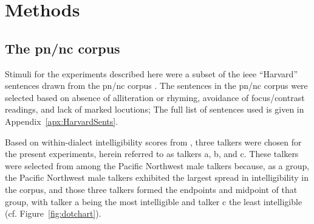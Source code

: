 \chapter{Methods\label{chap:Methods}}

\section{The \ac{pn/nc} corpus}
Stimuli for the experiments described here were a subset of the \ac{ieee} “Harvard” sentences \citep{HarvardSents} drawn from the \ac{pn/nc} corpus \citep{xxx}.  The sentences in the \ac{pn/nc} corpus were selected based on absence of alliteration or rhyming, avoidance of focus/contrast readings, and lack of marked locutions; The full list of sentences used is given in Appendix~\ref{apx:HarvardSents}.  

Based on within-dialect intelligibility scores from \citet{McCloyEtAl2013}, three talkers were chosen for the present experiments, herein referred to as talkers \ac{a}, \ac{b}, and \ac{c}.  These talkers were selected from among the Pacific Northwest male talkers because, as a group, the Pacific Northwest male talkers exhibited the largest spread in intelligibility in the corpus, and those three talkers formed the endpoints and midpoint of that group, with talker \ac{a} being the most intelligible and talker \ac{c} the least intelligible (cf. Figure~\ref{fig:dotchart}).

